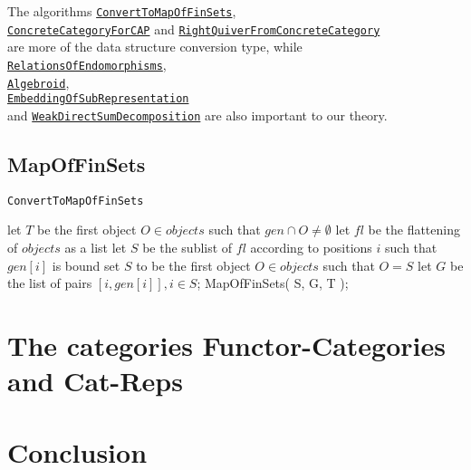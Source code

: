 \documentclass{article}
\begin{document}
The algorithms \hyperref[func:ConvertToMapOfFinSets]{\texttt{ConvertToMapOfFinSets}},\\
\hyperref[func:ConcreteCategoryForCAP]{\texttt{ConcreteCategoryForCAP}} and
\hyperref[func:RightQuiverFromConcreteCategory]{\texttt{RightQuiverFromConcreteCategory}}\\
are more of the data structure conversion type, while 
\hyperref[func:RelationsOfEndomorphisms]{\texttt{RelationsOfEndomorphisms}},\\
\hyperref[func:Algebroid]{\texttt{Algebroid}},\\
\hyperref[func:EmbeddingOfSubRepresentation]{\texttt{EmbeddingOfSubRepresentation}}\\
and \hyperref[func:WeakDirectSumDecomposition]{\texttt{WeakDirectSumDecomposition}} are also important to our theory.

\subsection{MapOfFinSets}

\begin{algorithm}\capstart
   \caption{\texttt{ConvertToMapOfFinSets}}\label{algo:ConvertToMapOfFinSets}
      \BlankLine
      let $T$ be the first object $O \in objects$ such that $gen \cap O \not= \emptyset$\;
      let $fl$ be the flattening of $objects$ as a list\;
      let $S$ be the sublist of $fl$ according to positions $i$ such that $gen[i]$ is bound\;
      set $S$ to be the first object $O \in objects$ such that $O = S$\;
      \BlankLine
      let $G$ be the list of pairs $[ i, gen[i] ], i \in S$;
      \BlankLine
      \Return MapOfFinSets( S, G, T );
\end{algorithm}

\section{The categories Functor-Categories and Cat-Reps}
\section{Conclusion}
\end{document}
